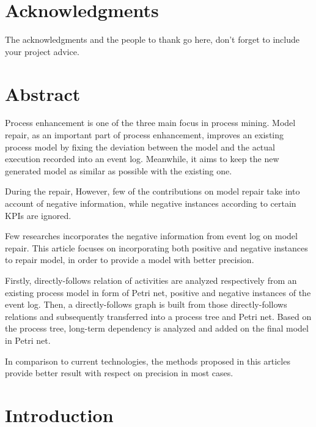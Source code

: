 \documentclass[a4paper,11pt,twoside,openright]{WCarticle}
\begin{document}

\tpage
\pagestyle{plain}

\chapter*{Acknowledgments}
The acknowledgments and the people to thank go here, don't forget to include your project advice. 

\chapter*{Abstract} 
Process enhancement is one of the three main focus in process mining. Model repair, as an important part of process enhancement, improves an existing process model by fixing the deviation between the model and the actual execution recorded into an event log. Meanwhile, it aims to keep the new generated model as similar as possible with the existing one. 

During the repair, 
However, few of the contributions on model repair take into account of negative information, while negative instances according to certain KPIs are ignored. 

Few researches incorporates the negative information from event log on model repair. This article focuses on  incorporating both positive and negative instances to repair model, in order to provide a model with better precision. 

Firstly, directly-follows relation of activities are analyzed respectively from an existing process model in form of Petri net,  positive and negative instances of the event log. Then, a directly-follows graph is built from those directly-follows relations and subsequently transferred into a process tree and Petri net. Based on the process tree, long-term dependency is analyzed and added on the final model in Petri net.

In comparison to current technologies, the methods proposed in this articles provide better result with respect on precision in most cases. 

\tableofcontents
\listoffigures
\listoftables
\cleardoublepage
\pagestyle{fancy}

\chapter{Introduction} \label{chap:intro}

\end{document}
